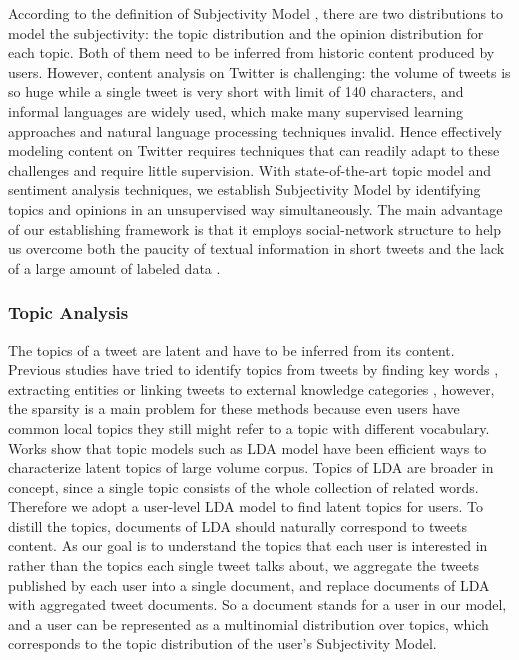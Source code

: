 \documentclass[runningheads,a4paper]{llncs}
\begin{document}
According to the definition of Subjectivity Model , there are two distributions to model the subjectivity: the topic distribution and the opinion distribution for each topic. Both of them need to be inferred from historic content produced by users.
However, content analysis on Twitter is challenging: the volume of tweets is so huge while a single tweet is very short with limit of 140 characters, and informal languages are widely used, which make many supervised learning approaches and natural language processing techniques invalid. 
Hence effectively modeling content on Twitter requires techniques that can readily adapt to these challenges and require little supervision. 
With state-of-the-art topic model and sentiment analysis techniques, we establish Subjectivity Model by identifying topics and opinions in an unsupervised way simultaneously. The main advantage of our establishing framework is that it employs social-network structure to help us overcome both the paucity of textual information in short tweets and the lack of a large amount of labeled data \cite{lin2010comparative}.


\subsubsection{Topic Analysis}
\label{topic}

The topics of a tweet are latent and have to be inferred from its content.
Previous studies have tried to identify topics from tweets by finding key words \cite{chen2010short}, extracting  entities \cite{abel2011analyzing} or linking tweets to external knowledge categories \cite{macskassy2011people}, however, the sparsity is a main problem for these methods because even users have common local topics they still might refer to a topic with different vocabulary.
Works show that topic models such as LDA model \cite{blei2003latent} have been efficient ways to characterize latent topics of large volume corpus.  
Topics of LDA are broader in concept, since a single topic consists of the whole collection of related words. 
Therefore we adopt a user-level LDA model to find latent topics for users.
To distill the topics, documents of LDA should naturally correspond to tweets content. 
As our goal is to understand the topics that each user is interested in rather than the topics each single tweet talks about, we aggregate the tweets published by each user into a single document, and replace documents of LDA with aggregated tweet documents. 
So a document stands for a user in our model, and a user can be represented as a multinomial distribution over topics, which corresponds to the topic distribution of the user's Subjectivity Model.
\end{document}
